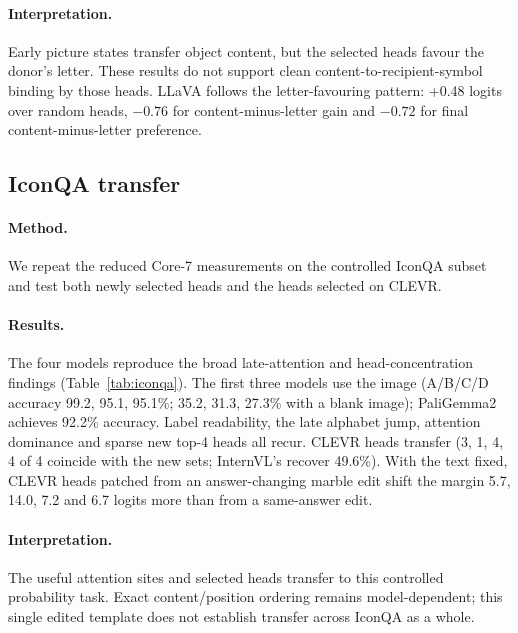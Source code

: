 \documentclass[11pt]{article}
\begin{document}
\paragraph{Interpretation.} Early picture states transfer object content, but the selected heads favour the donor's letter. These results do not support clean content-to-recipient-symbol binding by those heads. LLaVA follows the letter-favouring pattern: +0.48 logits over random heads, $-0.76$ for content-minus-letter gain and $-0.72$ for final content-minus-letter preference.

\subsection{IconQA transfer}

\paragraph{Method.} We repeat the reduced Core-7 measurements on the controlled IconQA subset and test both newly selected heads and the heads selected on CLEVR.

\paragraph{Results.} The four models reproduce the broad late-attention and head-concentration findings (Table~\ref{tab:iconqa}). The first three models use the image (A/B/C/D accuracy 99.2, 95.1, 95.1\%; 35.2, 31.3, 27.3\% with a blank image); PaliGemma2 achieves 92.2\% accuracy. Label readability, the late alphabet jump, attention dominance and sparse new top-4 heads all recur. CLEVR heads transfer (3, 1, 4, 4 of 4 coincide with the new sets; InternVL's recover 49.6\%). With the text fixed, CLEVR heads patched from an answer-changing marble edit shift the margin 5.7, 14.0, 7.2 and 6.7 logits more than from a same-answer edit.

\paragraph{Interpretation.} The useful attention sites and selected heads transfer to this controlled probability task. Exact content/position ordering remains model-dependent; this single edited template does not establish transfer across IconQA as a whole.
\end{document}
